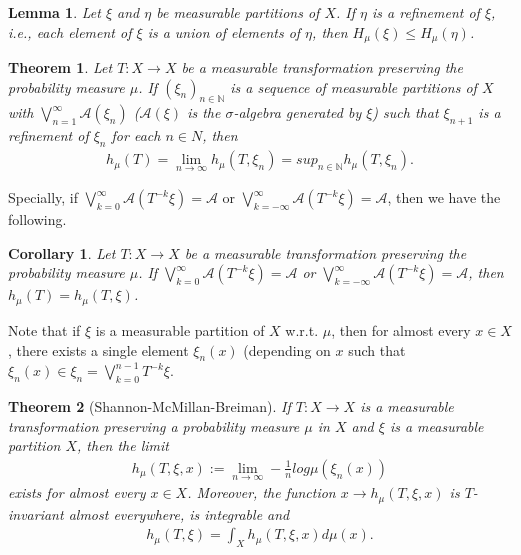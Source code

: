 \documentclass[a4paper,10pt]{amsart}
\newtheorem{theorem}{Theorem}[section]
\newtheorem{corollary}{Corollary}[section]
\newtheorem{lemma}{Lemma}[section]
\newcommand{\A}{\mathcal{A}}
\newcommand{\N}{\mathbb N} %
\begin{document}
\begin{lemma}
   Let $\xi$ and $\eta$ be measurable partitions of $X$. If $\eta$ is 
   a refinement of $\xi$, i.e., each element of $\xi$ is a union of 
   elements of $\eta$, then $H_{\mu}(\xi) \leq H_{\mu}(\eta)$.
\end{lemma}

\begin{theorem}
   Let $T: X \rightarrow X$ be a measurable transformation preserving 
   the probability measure $\mu$. If $(\xi_{n})_{n \in \N}$ is a sequence
   of  measurable partitions of $X$ with $\bigvee^{\infty}_{n = 1}\A(\xi_n)$
   ($\A(\xi)$ is the $\sigma$-algebra generated by $\xi$) such that 
   $\xi_{n+1}$ is a refinement of $\xi_{n}$ for each $n \in N$, then
   \begin{align*}
       h_{\mu}(T) = \lim_{n \rightarrow \infty}h_{\mu}(T, \xi_{n})
       = sup_{n \in \N} h_{\mu}(T, \xi_n).
   \end{align*}
\end{theorem}
 
Specially, if $\bigvee_{k=0}^{\infty} \A(T^{-k}\xi) = \A$ or 
$\bigvee_{k=-\infty}^{\infty} \A(T^{-k}\xi) = \A$, 
then we have the following.

\begin{corollary}
    Let $T: X \rightarrow X$ be a measurable transformation preserving 
    the probability measure $\mu$. If $\bigvee_{k=0}^{\infty} \A(T^{-k}\xi) = \A$ or 
    $\bigvee_{k=-\infty}^{\infty} \A(T^{-k}\xi) = \A$, then 
    $h_{\mu}(T) = h_{\mu}(T, \xi)$. 
\end{corollary}

Note that if $\xi$ is a measurable partition of $X$ w.r.t. $\mu$, then
for almost every $x \in X$, there exists a single element $\xi_{n}(x)$
(depending on $x$ such that $\xi_{n}(x) \in \xi_{n} = \bigvee_{k = 0}^{n-1}T^{-k}\xi$.

\begin{theorem}[Shannon-McMillan-Breiman]
   If $T: X \rightarrow X$ is a measurable transformation preserving a 
   probability measure $\mu$ in $X$ and $\xi$ is a measurable partition $X$,
   then the limit
   \begin{align*}
       h_{\mu}(T, \xi, x) := \lim_{n \rightarrow \infty} -\frac{1}{n}
       log \mu(\xi_{n}(x))
   \end{align*}
   exists for almost every $x \in X$. Moreover, the function $x \rightarrow 
   h_{\mu}(T, \xi, x)$ is $T$-invariant almost everywhere, is integrable
   and 
   \begin{align*}
       h_{\mu}(T, \xi) = \int_{X} h_{\mu}(T, \xi, x)d\mu(x). 
   \end{align*}
\end{theorem}
\end{document}
